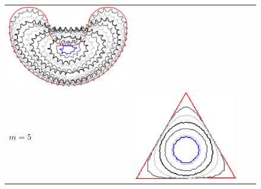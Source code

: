\begin{figure}
\begin{tabular}{p{3em}ccc}
\includegraphics[scale=0.25]{figures/chapter6/level-effect/bean/improve/len_pen0/radius-9/level1/summary.pdf} \\[2em]
$m=5$ & \includegraphics[scale=0.25]{figures/chapter6/level-effect/triangle/improve/len_pen0/radius-9/level5/summary.pdf} &

\end{tabular}
\end{figure}
